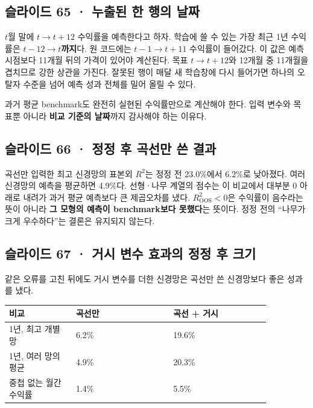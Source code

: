 \documentclass[11pt,a4paper]{article}
\begin{document}
\subsection{슬라이드 65 · 누출된 한 행의 날짜}
$t$월 말에 $t\to t+12$ 수익률을 예측한다고 하자. 학습에 쓸 수 있는 가장 최근 1년 수익률은 \textbf{$t-12\to t$까지}다. 원 코드에는 $t-1\to t+11$ 수익률이 들어갔다. 이 값은 예측 시점보다 11개월 뒤의 가격이 있어야 계산된다. 목표 $t\to t+12$와 12개월 중 11개월을 겹치므로 강한 상관을 가진다. 잘못된 행이 매달 새 학습창에 다시 들어가면 하나의 오탈자 수준을 넘어 예측 성과 전체를 밀어 올릴 수 있다.\par

과거 평균 benchmark도 완전히 실현된 수익률만으로 계산해야 한다. 입력 변수와 목표뿐 아니라 \textbf{비교 기준의 날짜}까지 감사해야 하는 이유다.\par

\subsection{슬라이드 66 · 정정 후 곡선만 쓴 결과}
곡선만 입력한 최고 신경망의 표본외 $R^2$는 정정 전 23.0\%에서 6.2\%로 낮아졌다. 여러 신경망의 예측을 평균하면 4.9\%다. 선형·나무 계열의 점수는 이 비교에서 대부분 0 아래로 내려가 과거 평균 예측보다 큰 제곱오차를 냈다. $R^2_{\mathrm{OOS}}<0$은 수익률이 음수라는 뜻이 아니라 \textbf{그 모형의 예측이 benchmark보다 못했다}는 뜻이다. 정정 전의 “나무가 크게 우수하다”는 결론은 유지되지 않는다.\par

\subsection{슬라이드 67 · 거시 변수 효과의 정정 후 크기}
같은 오류를 고친 뒤에도 거시 변수를 더한 신경망은 곡선만 쓴 신경망보다 좋은 성과를 냈다.\par

\begin{center}\small\begin{longtable}{p{0.22\linewidth}p{0.32\linewidth}p{0.32\linewidth}}\hline
비교 & 곡선만 & 곡선 + 거시 \\ \hline
1년, 최고 개별망 & 6.2\% & 19.6\% \\
1년, 여러 망의 평균 & 4.9\% & 20.3\% \\
중첩 없는 월간 수익률 & 1.4\% & 5.5\% \\
\hline\end{longtable}\end{center}\normalsize
\end{document}
